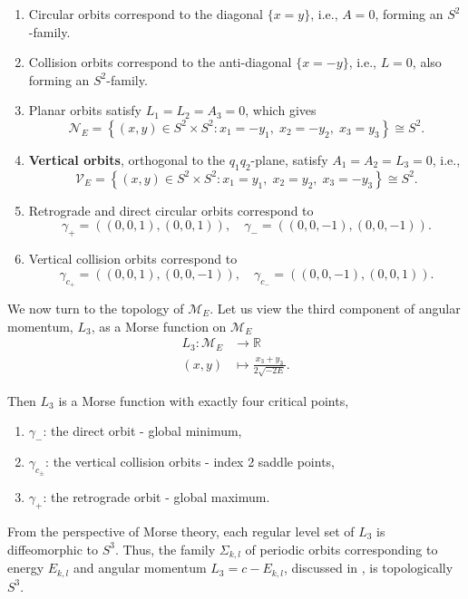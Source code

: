 \documentclass{amsart}
\begin{document}
\begin{enumerate}
	\item Circular orbits correspond to the diagonal $\{ x = y \}$, i.e., $A = 0$, forming an $S^2$-family.
	
	\item Collision orbits correspond to the anti-diagonal $\{ x = -y \}$, i.e., $L = 0$, also forming an $S^2$-family.
	
	\item Planar orbits satisfy $L_1 = L_2 = A_3 = 0$, which gives
	$$
	\mathcal{N}_E = \left\{ (x, y) \in S^2 \times S^2 : x_1 = -y_1,\; x_2 = -y_2,\; x_3 = y_3 \right\} \cong S^2.
	$$
	
	\item \textbf{Vertical orbits}, orthogonal to the $q_1q_2$-plane, satisfy $A_1 = A_2 = L_3 = 0$, i.e.,
	$$
	\mathcal{V}_E = \left\{ (x, y) \in S^2 \times S^2 : x_1 = y_1,\; x_2 = y_2,\; x_3 = -y_3 \right\} \cong S^2.
	$$
	
	\item Retrograde and direct circular orbits correspond to
	$$
	\gamma_+ = ((0,0,1), (0,0,1)), \quad \gamma_- = ((0,0,-1), (0,0,-1)).
	$$
	
	\item Vertical collision orbits correspond to
	$$
	\gamma_{c_+} = ((0,0,1), (0,0,-1)), \quad \gamma_{c_-} = ((0,0,-1), (0,0,1)).
	$$
\end{enumerate}

We now turn to the topology of $\mathcal{M}_E$.
Let us view the third component of angular momentum, $L_3$, as a Morse function on $\mathcal{M}_E$
$$
\begin{aligned}
	L_3: \mathcal{M}_E &\to \mathbb{R} \\
	(x, y) &\mapsto \frac{x_3 + y_3}{2\sqrt{-2E}}.
\end{aligned}
$$

Then $L_3$ is a Morse function with exactly four critical points,
\begin{enumerate}
	\item $\gamma_-$: the direct orbit - global minimum,
	\item $\gamma_{c_\pm}$: the vertical collision orbits - index 2 saddle points,
	\item $\gamma_+$: the retrograde orbit - global maximum.
\end{enumerate}

From the perspective of Morse theory, each regular level set of $L_3$ is diffeomorphic to $S^3$.
Thus, the family $\Sigma_{k,l}$ of periodic orbits corresponding to energy $E_{k,l}$ and angular momentum $L_3 = c - E_{k,l}$, discussed in , is topologically $S^3$.
\end{document}
